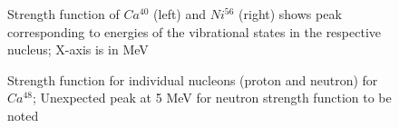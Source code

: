 \documentclass[a4paper]{paper}
\begin{document}
                    \begin{figure}[h]
                        \centering
                        \qquad
                        \caption{Strength function of $Ca^{40}$ (left) and $Ni^{56}$ (right) shows peak corresponding to energies of the vibrational states in the respective nucleus; X-axis is in MeV}
                        \label{fig:strength}
                    \end{figure}
                    \begin{figure}[H]
                        \centering
                        \qquad
                        \caption{Strength function for individual nucleons (proton and neutron) for $Ca^{48}$; Unexpected peak at 5 MeV for neutron strength function to be noted}
                        \label{fig:npstrength}
                    \end{figure}
\end{document}
